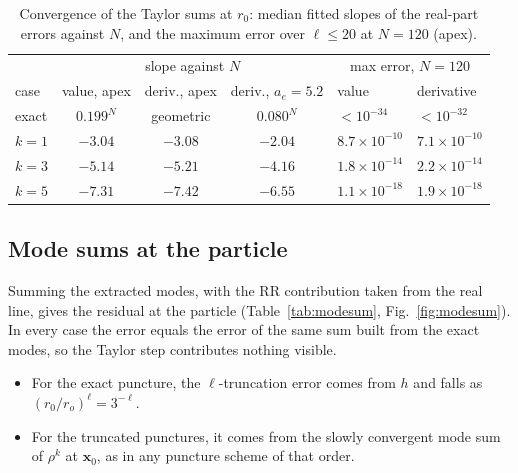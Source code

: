 \documentclass[11pt,a4paper]{article}
\newcommand{\x}{\mathbf{x}}
\begin{document}
\begin{table}[t]
\centering
\caption{Convergence of the Taylor sums at $r_0$: median fitted slopes of the real-part errors against $N$, and the maximum error over $\ell\le20$ at $N=120$ (apex).}
\label{tab:rates}
\small
\begin{tabular}{lcccll}
\toprule
 & \multicolumn{3}{c}{slope against $N$} & \multicolumn{2}{c}{max error, $N=120$}\\
case & value, apex & deriv., apex & deriv., $a_e=5.2$ & value & derivative\\
\midrule
exact & $0.199^N$ & geometric & $0.080^N$ & $<10^{-34}$ & $<10^{-32}$\\
$k=1$ & $-3.04$ & $-3.08$ & $-2.04$ & $8.7\times10^{-10}$ & $7.1\times10^{-10}$\\
$k=3$ & $-5.14$ & $-5.21$ & $-4.16$ & $1.8\times10^{-14}$ & $2.2\times10^{-14}$\\
$k=5$ & $-7.31$ & $-7.42$ & $-6.55$ & $1.1\times10^{-18}$ & $1.9\times10^{-18}$\\
\bottomrule
\end{tabular}
\end{table}

\subsection{Mode sums at the particle}
Summing the extracted modes, with the RR contribution taken from the real line, gives the residual at the particle (Table~\ref{tab:modesum}, Fig.~\ref{fig:modesum}).
In every case the error equals the error of the same sum built from the exact modes, so the Taylor step contributes nothing visible.
\begin{itemize}[leftmargin=*]
\item For the exact puncture, the $\ell$-truncation error comes from $h$ and falls as $(r_0/r_o)^\ell=3^{-\ell}$.
\item For the truncated punctures, it comes from the slowly convergent mode sum of $\rho^k$ at $\x_0$, as in any puncture scheme of that order.
\end{itemize}
\end{document}
